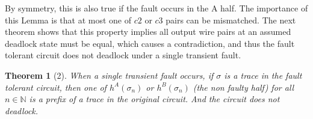 \documentclass[12pt]{report}
\newtheorem*{theorem}{Theorem}
\newtheorem*{corollary}{Corollary}
\begin{document}
By symmetry, this is also true if the fault occurs in the A half.  
The importance of this Lemma is that at most one of $c2$ or $c3$ pairs can be mismatched.  The next theorem shows that this property implies all output wire pairs at an assumed deadlock state must be equal, which causes a contradiction, and thus the fault tolerant circuit does not deadlock under a single transient fault.


\begin{theorem}[2]
When a single transient fault occurs, if $\sigma$ is a trace in the fault tolerant circuit, then one of $h^{A}(\sigma_n)$ or $h^{B}(\sigma_n)$ (the non faulty half) for all $n \in \mathbb{N}$ is a prefix of a trace in the original circuit.  And the circuit does not deadlock.  
\end{theorem}
\end{document}
